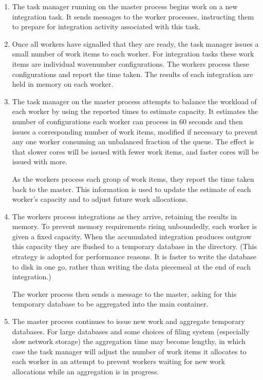 \documentclass[11pt,a4paper]{article}
\renewcommand{\texttt}[1]{{\ttfamily\fontseries{l}\selectfont{#1}}}
\newcommand{\file}[1]{\texttt{{#1}}}
\begin{document}
\begin{enumerate}
    \item The task manager running on the master process begins work on a new
    integration task. It sends messages to the worker processes, instructing them
    to prepare for integration activity associated with this task.
    
    \item Once all workers have signalled that they are ready,
    the task manager issues a small number of work items to each worker.
    For integration tasks these work items are individual wavenumber
    configurations.
    The workers process these configurations and report the time taken.
    The results of each integration are held in memory on each worker.
    
    \item The task manager on the master process attempts to balance the workload
    of each worker by using the reported times to estimate capacity.
    It estimates the number of configurations each worker can process in 60 seconds
    and then issues a corresponding number of work items, modified if necessary to
    prevent any one worker consuming an unbalanced fraction of
    the queue.
    The effect is that slower cores will be issued with fewer work items,
    and faster cores will be issued with more.

    As the workers process each group of work items, they report the time taken
    back to the master. This information is used to update the estimate
    of each worker's capacity
    and to adjust future work allocations.
    
    \item The workers process integrations as they arrive, retaining the
    results in memory.
    To prevent memory requirements rising unboundedly, each worker
    is given a fixed capacity.
    When the accumulated integration produces outgrow this capacity
    they are flushed to a temporary database in the
    \file{tempfiles} directory.
    (This strategy is adopted for performance reasons. It is faster
    to write the database to disk in one go, rather than
    writing the data piecemeal at the end of each integration.)

    The worker process then sends a message to the master,
    asking for this temporary database to be aggregated into the main
    container.
    
    \item The master process continues to issue new work and aggregate
    temporary databases.
    For large databases and some choices of filing system
    (especially slow network storage)
    the aggregation time may become lengthy, in which case
    the task manager will adjust the number of work items
    it allocates to each worker in an attempt to prevent
    workers waiting for new work allocations while an aggregation is
    in progress.
    

\end{enumerate}
\end{document}
